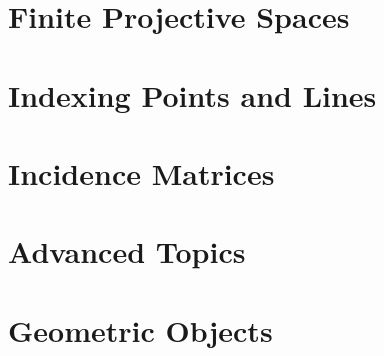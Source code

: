 

\section{Finite Projective Spaces}
\label{sec:FPG}






\bigskip

\clearpage


\section{Indexing Points and Lines}
\label{sec:indexing:points}






\bigskip

\clearpage




\section{Incidence Matrices}
\label{sec:incidence:matrices}






\bigskip

\clearpage




\section{Advanced Topics}
\label{sec:advanced:topics}






\bigskip

\clearpage


\section{Geometric Objects}
\label{sec:geometric:objects}






\bigskip

\clearpage

